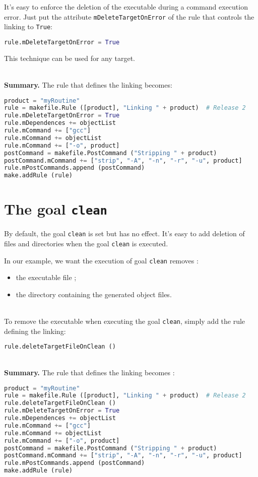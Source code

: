 \documentclass[a4paper,11pt]{extarticle}
\begin{document}
It's easy to enforce the deletion of the executable during a command execution error. Just put the attribute \texttt{mDeleteTargetOnError} of the rule that controls the linking to \texttt{True}:

\begin{lstlisting}[language=py]
rule.mDeleteTargetOnError = True
\end{lstlisting}
This technique can be used for any target.

~\\{\bf Summary.} The rule that defines the linking becomes:
\begin{lstlisting}[language=py]
product = "myRoutine"
rule = makefile.Rule ([product], "Linking " + product)  # Release 2
rule.mDeleteTargetOnError = True
rule.mDependences += objectList
rule.mCommand += ["gcc"]
rule.mCommand += objectList
rule.mCommand += ["-o", product]
postCommand = makefile.PostCommand ("Stripping " + product)
postCommand.mCommand += ["strip", "-A", "-n", "-r", "-u", product]
rule.mPostCommands.append (postCommand)
make.addRule (rule)
\end{lstlisting}







\section{The goal \texttt{clean}}

By default, the goal \texttt{clean} is set but has no effect. It's easy to add deletion of files and directories when the goal \texttt{clean} is executed.

In our example, we want the execution of goal \texttt{clean} removes :
\begin{itemize}
  \item the executable file ;
  \item the directory containing the generated object files.
\end{itemize}

~\\To remove the executable when executing the goal \texttt{clean}, simply add the rule defining the linking:

\begin{lstlisting}[language=py]
rule.deleteTargetFileOnClean ()
\end{lstlisting}


~\\{\bf Summary.} The rule that defines the linking becomes :
\begin{lstlisting}[language=py]
product = "myRoutine"
rule = makefile.Rule ([product], "Linking " + product)  # Release 2
rule.deleteTargetFileOnClean ()
rule.mDeleteTargetOnError = True
rule.mDependences += objectList
rule.mCommand += ["gcc"]
rule.mCommand += objectList
rule.mCommand += ["-o", product]
postCommand = makefile.PostCommand ("Stripping " + product)
postCommand.mCommand += ["strip", "-A", "-n", "-r", "-u", product]
rule.mPostCommands.append (postCommand)
make.addRule (rule)
\end{lstlisting}
\end{document}
